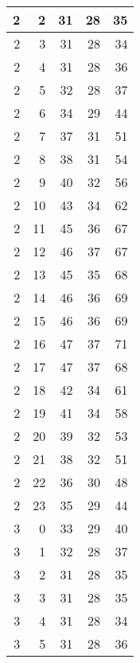 \begin{longtable}{|r|r|r|r|r|}
    \hline
    2     & 2     & 31    & 28    & 35 \\
    \hline
    2     & 3     & 31    & 28    & 34 \\
    \hline
    2     & 4     & 31    & 28    & 36 \\
    \hline
    2     & 5     & 32    & 28    & 37 \\
    \hline
    2     & 6     & 34    & 29    & 44 \\
    \hline
    2     & 7     & 37    & 31    & 51 \\
    \hline
    2     & 8     & 38    & 31    & 54 \\
    \hline
    2     & 9     & 40    & 32    & 56 \\
    \hline
    2     & 10    & 43    & 34    & 62 \\
    \hline
    2     & 11    & 45    & 36    & 67 \\
    \hline
    2     & 12    & 46    & 37    & 67 \\
    \hline
    2     & 13    & 45    & 35    & 68 \\
    \hline
    2     & 14    & 46    & 36    & 69 \\
    \hline
    2     & 15    & 46    & 36    & 69 \\
    \hline
    2     & 16    & 47    & 37    & 71 \\
    \hline
    2     & 17    & 47    & 37    & 68 \\
    \hline
    2     & 18    & 42    & 34    & 61 \\
    \hline
    2     & 19    & 41    & 34    & 58 \\
    \hline
    2     & 20    & 39    & 32    & 53 \\
    \hline
    2     & 21    & 38    & 32    & 51 \\
    \hline
    2     & 22    & 36    & 30    & 48 \\
    \hline
    2     & 23    & 35    & 29    & 44 \\
    \hline
    3     & 0     & 33    & 29    & 40 \\
    \hline
    3     & 1     & 32    & 28    & 37 \\
    \hline
    3     & 2     & 31    & 28    & 35 \\
    \hline
    3     & 3     & 31    & 28    & 35 \\
    \hline
    3     & 4     & 31    & 28    & 34 \\
    \hline
    3     & 5     & 31    & 28    & 36 \\

\end{longtable}
